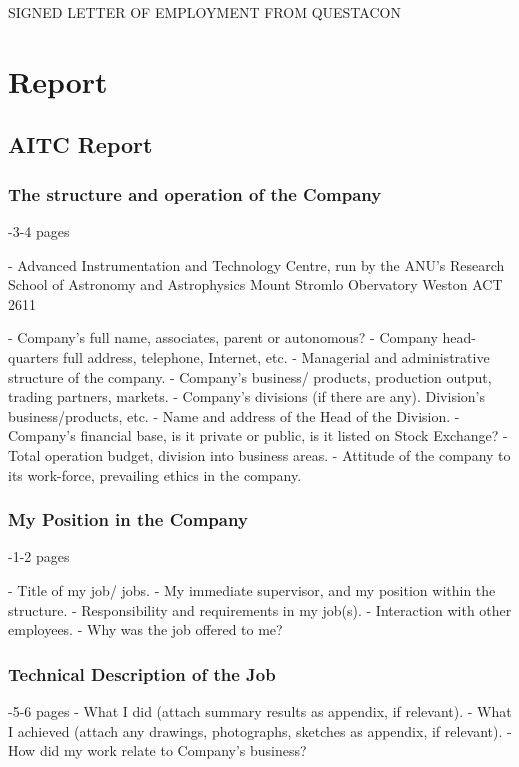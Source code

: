 \documentclass[11pt]{article}
\begin{document}
SIGNED LETTER OF EMPLOYMENT FROM QUESTACON

\newpage

\section{Report}

\subsection{AITC Report}

\subsubsection{The structure and operation of the Company}
-3-4 pages

- Advanced Instrumentation and Technology Centre, run by the ANU's Research School of Astronomy and Astrophysics
Mount Stromlo Obervatory
Weston ACT 2611



- Company's full name, associates, parent or autonomous?
- Company head-quarters full address, telephone, Internet, etc.
- Managerial and administrative structure of the company.
- Company's business/ products, production output, trading partners, markets.
- Company's divisions (if there are any). Division's business/products, etc.
- Name and address of the Head of the Division.
- Company's financial base, is it private or public, is it listed on Stock Exchange?
- Total operation budget, division into business areas.
- Attitude of the company to its work-force, prevailing ethics in the company.

\subsubsection{My Position in the Company}
-1-2 pages

- Title of my job/ jobs.
- My immediate supervisor, and my position within the structure.
- Responsibility and requirements in my job(s).
- Interaction with other employees.
- Why was the job offered to me?

\subsubsection{Technical Description of the Job}
-5-6 pages
- What I did (attach summary results as appendix, if relevant).
- What I achieved (attach any drawings, photographs, sketches as appendix, if
relevant).
- How did my work relate to Company's business?
\end{document}
